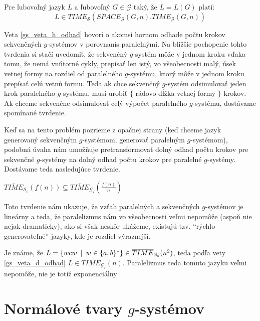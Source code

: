 \begin{veta}\label{gs_veta_h_odhad}
Pre ľubovoľný jazyk $L$ a ľubovoľný
$G\in\mathcal{G}$ taký, že $L=L(G)$ platí:
\[
L\in
TIME_{\mathcal{S}}(SPACE_{\mathcal{G}}(G,n).TIME_{\mathcal{G}}(G,n))
\]
\end{veta}

Veta \ref{gs_veta_h_odhad} hovorí o akomsi hornom odhade počtu  krokov
sekvenčných \mbox{$g$-sys}té\-mov v porovnaní\linebreak s
paralelnými. Na bližšie pochopenie tohto tvrdenia si stačí
uvedomiť, že sekvenčný $g$-systém môže v jednom kroku vďaka tomu,
že nemá vnútorné cykly, prepísať len istý, vo všeobecnosti malý,
úsek vetnej formy na rozdiel od paralelného $g$-systému, ktorý
môže v jednom kroku prepísať celú vetnú formu. Teda ak chce
sekvenčný $g$-systém odsimulovať jeden krok paralelného\linebreak
$g$-systému, musí urobiť $\{$ rádovo dĺžka vetnej formy $\}$
krokov. Ak chceme sekvenčne odsimulovať celý výpočet paralelného
$g$-systému, dostávame spomínané tvrdenie.

\smallskip
Keď sa na tento problém pozrieme z opačnej strany (keď chceme
jazyk generovaný sekvenčným $g$-systémom, generovať paralelným
$g$-systémom), podobná úvaha nám umožňuje pretransformovať dolný
odhad počtu krokov pre sekvenčné $g$-systémy na dolný odhad počtu
krokov pre paralelné $g$-systémy. Dostávame teda nasledujúce
tvrdenie.

\begin{veta}
\label{gs_veta_d_odhad}
$\overline{TIME}_{\mathcal{S_{\varepsilon}}}(f(n))\subseteq
\overline{TIME}_{\mathcal{G_{\varepsilon}}}(\frac{f(n)}{n})$
\end{veta}

Toto tvrdenie nám ukazuje, že vzťah paralelných a sekvenčných
$g$-systémov je lineárny a teda, že paralelizmus nám vo
všeobecnosti veľmi nepomôže (aspoň nie nejak dramaticky), ako si
však neskôr ukážeme, existujú tzv. ``rýchlo generovateľné''
jazyky, kde je rozdiel výraznejší.

\begin{priklad}
Je známe, že $L=\{wcw\enspace |\enspace
w\in\{a,b\}^*\}\in\overline{TIME}_{\mathcal{S_{\varepsilon}}}(n^2)$,
teda podľa vety \ref{gs_veta_d_odhad} $L\in
TIME_{\mathcal{G_{\varepsilon}}}(n)$. Paralelizmus teda tomuto
jazyku veľmi nepomôže, nie je totiž exponenciálny
\end{priklad}

\section{Normálové tvary $g$-systémov}

